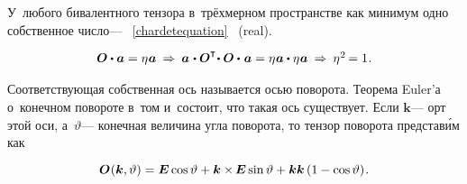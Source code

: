 \begin{otherlanguage}{russian}

У~любого бивалентного тензора в~трёхмерном пространстве как минимум одно собственное число\:--- ~\eqref{chardetequation}\ru{\:---} ~(real).
\en{,} 

\nopagebreak\vspace{1em}\begin{equation*}
\begin{array}{c}
\rotationtensor \dotp \bm{a} = \eigenvalue \bm{a}
\:\Rightarrow\:
\tikzmark{BeginPaBrace} \bm{a} \hspace{.16ex} \dotp \tikzmark{BeginEBrace} \rotationtensor^{\T} \tikzmark{EndPaBrace} \hspace{-0.4ex} \dotp \rotationtensor \hspace{-0.32ex}\tikzmark{EndEBrace}\hspace{.32ex} \dotp \hspace{.16ex} \bm{a} = \eigenvalue \bm{a} \dotp \eigenvalue \bm{a}
\:\Rightarrow\: \eigenvalue^{2} \hspace{-0.2ex} = 1 \hspace{.1ex} .
\end{array}
\end{equation*}

\vspace{-0.5em}\noindent
Соответствующая собственная ось называется осью поворота.
Теорема Euler’а о~конечном повороте в~том и~состоит, что такая ось существует.
Если ${\bm{k}}$\:--- орт этой оси, а~${\vartheta}$\:--- конечная величина угла поворота, то тензор поворота представ\'{и}м как

\nopagebreak\vspace{-0.1em}\begin{equation}\label{eulerfiniterotation}
\bm{O}\hspace{.1ex}(\bm{k}, \vartheta) = \bm{E} \operatorname{cos} \vartheta + \bm{k} \times\hspace{-0.2ex} \bm{E} \operatorname{sin} \vartheta + \bm{k} \bm{k} \left( {1 - \operatorname{cos} \vartheta} \right)
\hspace{-0.2ex} .
\end{equation}


\end{otherlanguage}
